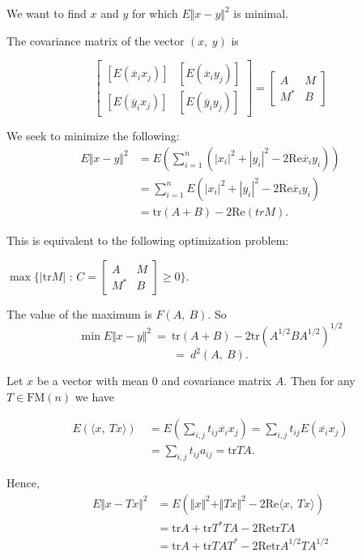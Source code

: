 We want to find $x$ and $y$ for which $E\Vert x-y\Vert^{2}$ is minimal.

The covariance matrix of the vector $(x,\ y)$ is

$$
\left[ \begin{matrix}
	[E(\overline{x}_{i}x_{j})] & [E(\overline{x}_{i}y_{j})] \\
	[E(\overline{y}_{i}x_{j})] & [E(\overline{y}_{i}y_{j})]
\end{matrix}\right]
=
\left[ \begin{matrix}
	A & M \\
	M^{*} & B
\end{matrix}\right]
$$

We seek to minimize the following:
\begin{align*}
E\Vert x-y\Vert^{2} &= E(\displaystyle \sum_{i=1}^{n}(|x_{i}|^{2}+|y_{i}|^{2}-2\mathrm{Re}\overline{x}_{i}y_{i})) \\
&= \sum_{i=1}^{n}E(|x_{i}|^{2}+|y_{i}|^{2}-2\mathrm{Re}\overline{x}_{i}y_{i}) \\
&= \mathrm{tr}(A+B)-2\mathrm{Re} (tr M).
\end{align*}

This is equivalent to the following optimization problem:

$\displaystyle \max\{|\mathrm{tr}M|$ : $C=\left[ \begin{matrix}
	A & M \\
	M^{*} & B
\end{matrix}\right] \geq 0\}.$

The value of the maximum is $F(A,\ B)$. So
$$
\min E\Vert x-y\Vert^{2}\ =\ \mathrm{t}\mathrm{r}(A+B)-2\mathrm{t}\mathrm{r}(A^{1/2}BA^{1/2})^{1/2}
$$
$$
=\ d^{2}(A,\ B).
$$

Let $x$ be a vector with mean $0$ and covariance matrix $A$. Then for any $T\in \mathrm{F}\mathrm{M}(n)$ we have

\begin{align*}
E(\langle x,\ Tx\rangle)\ &= E(\sum_{i,j}t_{ij}\overline{x_{i}}x_{j}) =\sum_{i,j}t_{ij}E(\overline{x_{i}}x_{j}) \\
&= \displaystyle \sum_{i,j}t_{ij}a_{ij}=\mathrm{tr} TA.
\end{align*}

Hence,
\begin{align*}
E\Vert x-Tx\Vert^{2} &= E(\Vert x\Vert^{2}+\Vert Tx\Vert^{2} - 2\textrm{Re}\langle x,\ Tx\rangle) \\	
&= \textrm{tr}A+\textrm{tr}T^{*}TA-2\textrm{Re} \textrm{tr} TA \\
&= \textrm{tr} A+\textrm{tr}TAT^{*}-2\textrm{Re} \textrm{tr} A^{1/2}TA^{1/2}
\end{align*}

